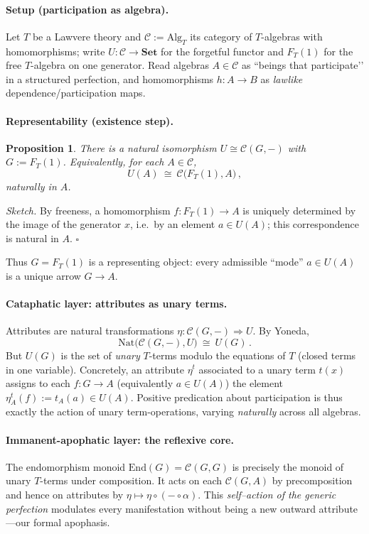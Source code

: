 \documentclass[11pt]{article}
\theoremstyle{upright}
\newtheorem{proposition}{Proposition}
\begin{document}
\paragraph{Setup (participation as algebra).}
Let \(T\) be a Lawvere theory and \(\mathcal C:=\mathrm{Alg}_T\) its category of \(T\)-algebras with homomorphisms; write \(U:\mathcal C\to\mathbf{Set}\) for the forgetful functor and \(F_T(1)\) for the free \(T\)-algebra on one generator. Read algebras \(A\in\mathcal C\) as ``beings that participate’’ in a structured perfection, and homomorphisms \(h:A\to B\) as \emph{lawlike} dependence/participation maps.

\paragraph{Representability (existence step).}
\begin{proposition}\label{prop:lawvere-rep}
There is a natural isomorphism \(U \cong \mathcal C(G,-)\) with \(G:=F_T(1)\). Equivalently, for each \(A\in\mathcal C\),
\[
U(A)\ \cong\ \mathcal C\!\big(F_T(1),A\big)\,,
\]
naturally in \(A\).
\end{proposition}
\emph{Sketch.} By freeness, a homomorphism \(f:F_T(1)\!\to\!A\) is uniquely determined by the image of the generator \(x\), i.e.\ by an element \(a\in U(A)\); this correspondence is natural in \(A\). \(\square\)

Thus \(G=F_T(1)\) is a representing object: every admissible “mode” \(a\in U(A)\) is a unique arrow \(G\to A\).

\paragraph{Cataphatic layer: attributes as unary terms.}
Attributes are natural transformations \(\eta:\mathcal C(G,-)\Rightarrow U\). By Yoneda,
\[
\mathrm{Nat}\big(\mathcal C(G,-),U\big)\ \cong\ U(G)\,.
\]
But \(U(G)\) is the set of \emph{unary} \(T\)-terms modulo the equations of \(T\) (closed terms in one variable). Concretely, an attribute \(\eta^t\) associated to a unary term \(t(x)\) assigns to each \(f:G\to A\) (equivalently \(a\in U(A)\)) the element \(\eta^t_A(f):=t_A(a)\in U(A)\). Positive predication about participation is thus exactly the action of unary term-operations, varying \emph{naturally} across all algebras.

\paragraph{Immanent-apophatic layer: the reflexive core.}
The endomorphism monoid \(\mathrm{End}(G)=\mathcal C(G,G)\) is precisely the monoid of unary \(T\)-terms under composition. It acts on each \(\mathcal C(G,A)\) by precomposition and hence on attributes by \(\eta\mapsto \eta\circ(-\circ \alpha)\). This \emph{self–action of the generic perfection} modulates every manifestation without being a new outward attribute—our formal apophasis.
\end{document}
